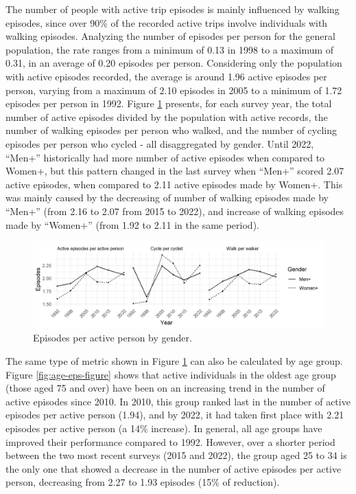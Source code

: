 \documentclass[preprint, 3p,
authoryear]{elsarticle} %
\begin{document}
The number of people with active trip episodes is mainly influenced by
walking episodes, since over 90\% of the recorded active trips involve
individuals with walking episodes. Analyzing the number of episodes per
person for the general population, the rate ranges from a minimum of
0.13 in 1998 to a maximum of 0.31, in an average of 0.20 episodes per
person. Considering only the population with active episodes recorded,
the average is around 1.96 active episodes per person, varying from a
maximum of 2.10 episodes in 2005 to a minimum of 1.72 episodes per
person in 1992. Figure \ref{fig:gender-eps-figure} presents, for each
survey year, the total number of active episodes divided by the
population with active records, the number of walking episodes per
person who walked, and the number of cycling episodes per person who
cycled - all disaggregated by gender. Until 2022, ``Men+'' historically
had more number of active episodes when compared to Women+, but this
pattern changed in the last survey when ``Men+'' scored 2.07 active
episodes, when compared to 2.11 active episodes made by Women+. This was
mainly caused by the decreasing of number of walking episodes made by
``Men+'' (from 2.16 to 2.07 from 2015 to 2022), and increase of walking
episodes made by ``Women+'' (from 1.92 to 2.11 in the same period).

\begin{figure}
\includegraphics[width=1\linewidth]{figures/eps_gender_graph} \caption{Episodes per active person by gender.}\label{fig:gender-eps-figure}
\end{figure}

The same type of metric shown in Figure \ref{fig:gender-eps-figure} can
also be calculated by age group. Figure \ref{fig:age-eps-figure} shows
that active individuals in the oldest age group (those aged 75 and over)
have been on an increasing trend in the number of active episodes since
2010. In 2010, this group ranked last in the number of active episodes
per active person (1.94), and by 2022, it had taken first place with
2.21 episodes per active person (a 14\% increase). In general, all age
groups have improved their performance compared to 1992. However, over a
shorter period between the two most recent surveys (2015 and 2022), the
group aged 25 to 34 is the only one that showed a decrease in the number
of active episodes per active person, decreasing from 2.27 to 1.93
episodes (15\% of reduction).
\end{document}
